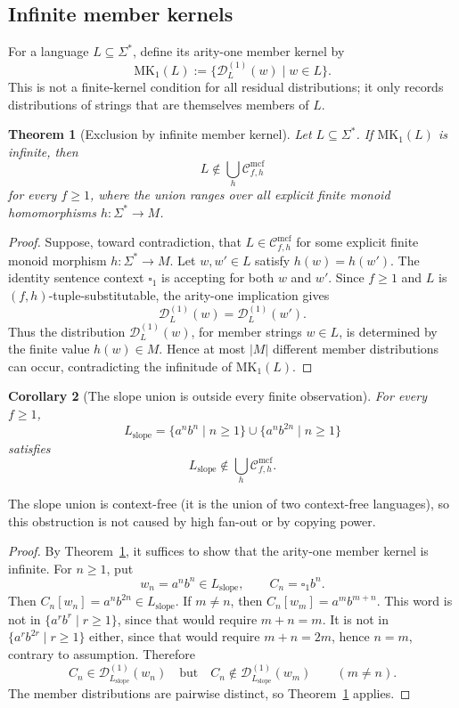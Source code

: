 \documentclass[11pt,a4paper]{article}
\newtheorem{theorem}{Theorem}[section]
\newtheorem{corollary}[theorem]{Corollary}
\theoremstyle{remark}
\newcommand{\Cmcf}[2]{\mathcal{C}^{\mathrm{mcf}}_{#1,#2}}
\newcommand{\D}{\mathcal{D}}
\newcommand{\blank}{\square}
\begin{document}
\subsection{Infinite member kernels}
\label{subsec:member-kernel-exclusion}

For a language \(L\subseteq\Sigma^*\), define its arity-one member kernel by
\[
  \mathrm{MK}_1(L):=\{\D_L^{(1)}(w)\mid w\in L\}.
\]
This is not a finite-kernel condition for all residual distributions; it only
records distributions of strings that are themselves members of \(L\).

\begin{theorem}[Exclusion by infinite member kernel]
\label{thm:member-kernel-exclusion}
Let \(L\subseteq\Sigma^*\).  If \(\mathrm{MK}_1(L)\) is infinite, then
\[
  L\notin \bigcup_h \Cmcf{f}{h}
\]
for every \(f\ge1\), where the union ranges over all explicit finite monoid
homomorphisms \(h:\Sigma^*\to M\).
\end{theorem}

\begin{proof}
Suppose, toward contradiction, that \(L\in\Cmcf{f}{h}\) for some explicit finite
monoid morphism \(h:\Sigma^*\to M\).  Let \(w,w'\in L\) satisfy \(h(w)=h(w')\).
The identity sentence context \(\blank_1\) is accepting for both \(w\) and
\(w'\).  Since \(f\ge1\) and \(L\) is \((f,h)\)-tuple-substitutable, the
arity-one implication gives
\[
  \D_L^{(1)}(w)=\D_L^{(1)}(w').
\]
Thus the distribution \(\D_L^{(1)}(w)\), for member strings \(w\in L\), is
determined by the finite value \(h(w)\in M\).  Hence at most \(|M|\) different
member distributions can occur, contradicting the infinitude of
\(\mathrm{MK}_1(L)\).
\end{proof}

\begin{corollary}[The slope union is outside every finite observation]
\label{cor:slope-union-outside-every-finite-observation}
For every \(f\ge1\),
\[
  L_{\mathrm{slope}}
  =
  \{a^n b^n\mid n\ge1\}
  \cup
  \{a^n b^{2n}\mid n\ge1\}
\]
satisfies
\[
  L_{\mathrm{slope}}\notin \bigcup_h \Cmcf{f}{h}.
\]
\end{corollary}

The slope union is context-free (it is the union of two context-free
languages), so this obstruction is not caused by high fan-out or by copying
power.

\begin{proof}
By Theorem~\ref{thm:member-kernel-exclusion}, it suffices to show that the
arity-one member kernel is infinite.  For \(n\ge1\), put
\[
  w_n=a^n b^n\in L_{\mathrm{slope}},
  \qquad
  C_n=\blank_1 b^n .
\]
Then \(C_n[w_n]=a^n b^{2n}\in L_{\mathrm{slope}}\).  If \(m\ne n\), then
\(C_n[w_m]=a^m b^{m+n}\).  This word is not in \(\{a^r b^r\mid r\ge1\}\), since
that would require \(m+n=m\).  It is not in \(\{a^r b^{2r}\mid r\ge1\}\) either,
since that would require \(m+n=2m\), hence \(n=m\), contrary to assumption.
Therefore
\[
  C_n\in\D_{L_{\mathrm{slope}}}^{(1)}(w_n)
  \quad\text{but}\quad
  C_n\notin\D_{L_{\mathrm{slope}}}^{(1)}(w_m)
  \qquad(m\ne n).
\]
The member distributions are pairwise distinct, so
Theorem~\ref{thm:member-kernel-exclusion} applies.
\end{proof}
\end{document}
